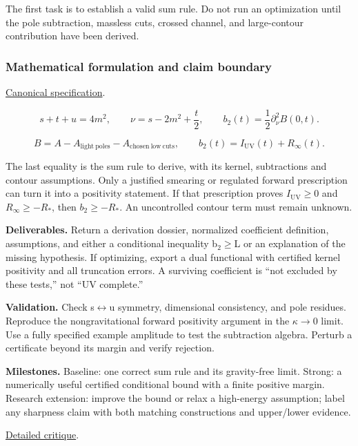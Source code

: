 \documentclass[
  11pt,
]{article}
\begin{document}
The first task is to establish a valid sum rule. Do not run an
optimization until the pole subtraction, massless cuts, crossed channel,
and large-contour contribution have been derived.

\subsubsection{Mathematical formulation and claim boundary}

\href{https://github.com/rick-stevens-ai/Pure-Thought/blob/main/PRDs/02-Gravitational-Positivity-Bounds.md}{Canonical
specification}.

\[s+t+u=4m^2,\qquad \nu=s-2m^2+\frac t2,\qquad
b_2(t)=\frac12\partial_\nu^2 B(0,t).\]

\[B=A-A_{\mathrm{light\ poles}}-A_{\mathrm{chosen\ low\ cuts}},\qquad
b_2(t)=I_{\mathrm{UV}}(t)+R_\infty(t).\]

The last equality is the sum rule to derive, with its kernel,
subtractions and contour assumptions. Only a justified smearing or
regulated forward prescription can turn it into a positivity statement.
If that prescription proves \(I_{\mathrm{UV}}\ge0\) and
\(R_\infty\ge-R_*\), then \(b_2\ge-R_*\). An uncontrolled contour term
must remain unknown.

\textbf{Deliverables.} Return a derivation dossier, normalized
coefficient definition, assumptions, and either a conditional inequality
b\ensuremath{{}_{2}}\ensuremath{\ge}L or an explanation of the missing
hypothesis. If optimizing, export a dual functional with certified
kernel positivity and all truncation errors. A surviving coefficient is
``not excluded by these tests,'' not ``UV complete.''

\textbf{Validation.} Check s\ensuremath{\leftrightarrow}u symmetry,
dimensional consistency, and pole residues. Reproduce the
nongravitational forward positivity argument in the
\ensuremath{\kappa}\ensuremath{\to}0 limit. Use a fully specified
example amplitude to test the subtraction algebra. Perturb a certificate
beyond its margin and verify rejection.

\textbf{Milestones.} Baseline: one correct sum rule and its gravity-free
limit. Strong: a numerically useful certified conditional bound with a
finite positive margin. Research extension: improve the bound or relax a
high-energy assumption; label any sharpness claim with both matching
constructions and upper/lower evidence.

\href{https://github.com/rick-stevens-ai/Pure-Thought/blob/main/reviews/02-Gravitational-Positivity-Bounds.md}{Detailed
critique}.
\end{document}
